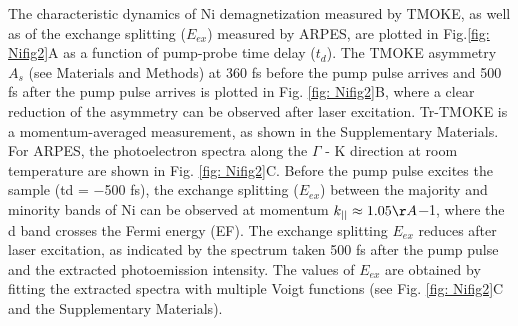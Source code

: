 The characteristic dynamics of Ni demagnetization measured by TMOKE, as well as of the exchange splitting ($E_{ex}$) measured by ARPES, are plotted in Fig.\ref{fig: Nifig2}A as a function of pump-probe time delay ($t_{d}$). The TMOKE asymmetry $A_{s}$ (see Materials and Methods) at 360 fs before the pump pulse arrives and 500 fs after the pump pulse arrives is plotted in Fig. \ref{fig: Nifig2}B, where a clear reduction of the asymmetry can be observed after laser excitation. Tr-TMOKE is a momentum-averaged measurement, as shown in the Supplementary Materials. For ARPES, the photoelectron spectra along the $\Gamma$ - K direction at room temperature are shown in Fig. \ref{fig: Nifig2}C. Before the pump pulse excites the sample (td = −500 fs), the exchange splitting ($E_{ex}$) between the majority and minority bands of Ni can be observed at momentum  $k_{||} \approx 1.05 \AA$−1, where the d band crosses the Fermi energy (EF)\cite{Rhie2003,Greber1997}. The exchange splitting $E_{ex}$ reduces after laser excitation, as indicated by the spectrum taken 500 fs after the pump pulse and the extracted photoemission intensity. The values of $E_{ex}$ are obtained by fitting the extracted spectra with multiple Voigt functions (see Fig. \ref{fig: Nifig2}C and the Supplementary Materials). 

